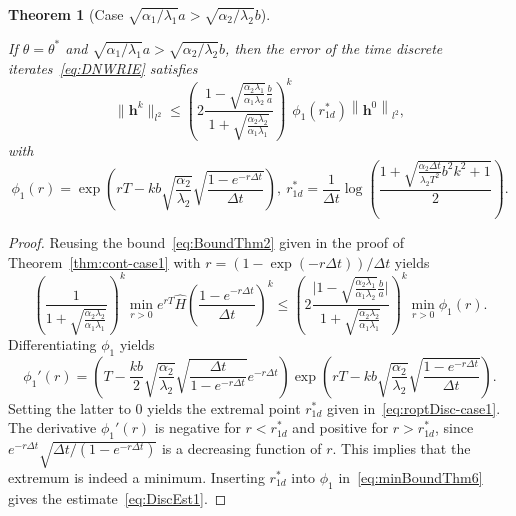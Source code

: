 \documentclass[10pt,a4paper]{amsart}
\newtheorem{theorem}{Theorem}
\newcommand{\norm}[1]{\left\lVert#1\right\rVert}
\begin{document}
\begin{theorem}[Case $\sqrt{\alpha_1/\lambda_1} a > \sqrt{\alpha_2/\lambda_2} b$]\label{thm:timeDisc-case1}

If $\theta = \theta^*$ and $\sqrt{\alpha_1/\lambda_1} a > \sqrt{\alpha_2/\lambda_2} b$, then the error of the time discrete iterates~\eqref{eq:DNWRIE} satisfies
\begin{equation}\label{eq:DiscEst1}
\|\boldsymbol{h}^k\|_{l^2} \leq  \left(2\frac{1 - \sqrt{\frac{\alpha_2 \lambda_1}{\alpha_1\lambda_2}}\frac{b}{a}}{1 + \sqrt{\frac{\alpha_2 \lambda_2}{\alpha_1\lambda_1}}} \right)^k \phi_1(r_{1d}^*) \norm{\boldsymbol{h}^0}_{l^2},
\end{equation}
with
\begin{equation}\label{eq:roptDisc-case1}
\phi_1(r) = \exp\left( rT  - kb\sqrt{\frac{\alpha_2}{\lambda_2}}\sqrt{\frac{1-e^{-r \Delta t}}{\Delta t}}\right), \ r^*_{1d} = \frac1{\Delta t}\log\left(\frac{1 + \sqrt{\frac{\alpha_2\Delta t}{\lambda_2T^2} b^2 k^2   + 1}}{2}\right).
\end{equation}
\end{theorem}

\begin{proof}
Reusing the bound~\eqref{eq:BoundThm2} given in the proof of Theorem~\ref{thm:cont-case1} with $r = (1-\exp(-r \Delta t))/\Delta t$ yields
\begin{equation}\label{eq:minBoundThm6}
\left(\frac1{1+\sqrt{\frac{\alpha_2\lambda_2}{\alpha_1\lambda_1}}}\right)^k\min_{r>0}e^{rT} \hat H \left(\frac{1-e^{-r \Delta t}}{\Delta t}\right)^k 
\leq \left(2\frac{\bigl|1 - \sqrt{\frac{\alpha_2 \lambda_1}{\alpha_1\lambda_2}}\frac{b}{a}\bigr|}{1 + \sqrt{\frac{\alpha_2 \lambda_2}{\alpha_1 \lambda_1}}} \right)^k\min_{r > 0} \phi_1(r).
\end{equation}
 Differentiating $\phi_1$ yields
\[\phi_1'(r) = \left(T - \frac{kb}{2}\sqrt{\frac{\alpha_2}{\lambda_2}}\sqrt{\frac{\Delta t}{1 - e^{-r \Delta t}}} e^{-r \Delta t} \right)\exp\left(r T -  kb\sqrt{\frac{\alpha_2}{\lambda_2}} \sqrt{\frac{1 - e^{-r \Delta t}}{\Delta t}} \right).\]
Setting the latter to 0 yields the extremal point $r^*_{1d}$ given in~\eqref{eq:roptDisc-case1}. The derivative $\phi_1'(r)$ is negative for $r<r^*_{1d}$ and positive for $r>r^*_{1d}$, since $e^{-r \Delta t}\sqrt{\Delta t/(1 - e^{-r \Delta t})}$ is a decreasing function of $r$. This implies that the extremum is indeed a minimum. Inserting $r^*_{1d}$ into $\phi_1$ in~\eqref{eq:minBoundThm6} gives the estimate~\eqref{eq:DiscEst1}.
\end{proof}
\end{document}
